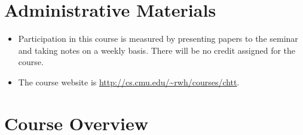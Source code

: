 \documentclass{article}
\begin{document}
\maketitle

\section{Administrative Materials}

\begin{itemize}
\item Participation in this course is measured by presenting papers to
  the seminar and taking notes on a weekly basis. There
  will be no credit assigned for the course.
\item The course website is \url{http://cs.cmu.edu/~rwh/courses/chtt}.
\end{itemize}

\section{Course Overview}
\end{document}
